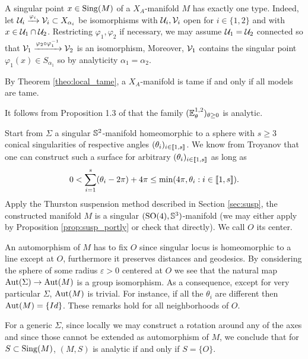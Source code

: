 \begin{rem}\label{rem:singular_point_manifold_has}
    A singular point $x\in \mathrm{Sing}(M)$ of a $X_A$-manifold $M$ has exactly one type. Indeed, let $\mathcal{U}_i\xrightarrow{\varphi_i} \mathcal V_i\subset X_{\alpha_i}$ be isomorphisms with $\mathcal{U}_i,\mathcal V_i$ open for $i\in \{1,2\}$ and with $x\in \mathcal{U}_1\cap \mathcal{U}_2$. Restricting $\varphi_1,\varphi_2$ if necessary, we may assume $\mathcal{U}_1=\mathcal{U}_2$ connected  so that $\mathcal V_1\xrightarrow{\varphi_2\circ \varphi_1^{-1}}\mathcal V_2$ is an isomorphism, Moreover, $\mathcal V_1$ contains the singular point $\varphi_1(x)\in S_{\alpha_1}$ so by analyticity $\alpha_1=\alpha_2$.
\end{rem}
\begin{rem}\label{rem:theorem_theo_local_tame}
 By Theorem \ref{theo:local_tame}, a $X_A$-manifold is tame if and only if all models are tame.
\end{rem}
\begin{ex}\label{ex:follows_proposition_brunswic_cauchy} It follows from Proposition 1.3 of  \cite{brunswic2021cauchy} that the family $({\mathbb E}^{1,2}_{\theta})_{\theta\geq 0}$ is analytic.
 
\end{ex}
\begin{cex}\label{cex:start_singular_manifold_homeomorphic} Start from $\Sigma$ a singular $\mathbb{S}^2$-manifold homeomorphic to a sphere with $s\geq 3$ conical singularities of respective angles $(\theta_i)_{i\in [\![ 1,s]\!]}$. We know from Troyanov \cite{MR1005085}  that one can construct such a surface for arbitrary  $(\theta_i)_{i\in [\![ 1,s]\!]}$ as long as $$0<\sum_{i=1}^s( \theta_i -2\pi) + 4\pi\leq \min(4\pi, \theta_i : i\in [\![ 1,s]\!]).$$
Apply the Thurston suspension method described in Section \ref{sec:susp}, the constructed manifold $M$ is  a singular $(\mathrm{SO}(4),\mathbb{S}^3)$-manifold (we may either apply  by Proposition \ref{prop:susp_portly}  or check that directly). We call $O$ its center.

An automorphism of $M$ has to fix $O$ since singular locus is homeomorphic to a line except at $O$, furthermore it preserves distances and geodesics. By considering the sphere of some radius $\varepsilon>0$ centered at $O$ we see that the natural map $\mathrm{Aut}(\Sigma)\rightarrow \mathrm{Aut}(M)$ is a group isomorphism.  As a consequence, except for very particular $\Sigma$, $\mathrm{Aut}(M)$ is trivial. For instance, if all the $\theta_i$ are different then $\mathrm{Aut}(M)=\{Id\}$. These remarks hold for all neighborhoods of $O$.

For a generic $\Sigma$, since locally we may construct a rotation around any of the axes and since  those cannot be extended as automorphism of $M$, we conclude that for $S\subset \mathrm{Sing}(M)$, $(M,S)$ is  analytic if and only if $S=\{O\}$.

 
\end{cex}


